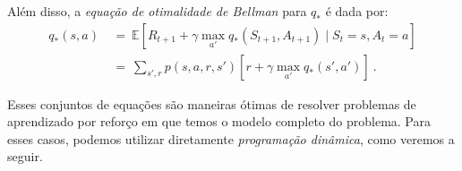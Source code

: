 \documentclass{article}
\begin{document}
            Além disso, a \emph{equação de otimalidade de Bellman} para $q_*$ é dada por:
            \begin{equation}
            \label{eq:optimal-action-value}
            \begin{split}
                q_*(s, a) & \ = \ \mathbb{E} [R_{t+1} + \gamma \max_{a'} q_*(S_{t+1}, A_{t+1}) \mid S_t = s, A_t = a] \\
                & \ = \ \sum_{s', r} p(s, a, r, s') [r + \gamma \max_{a'} q_*(s', a')]\ .
            \end{split}
            \end{equation}

            Esses conjuntos de equações são maneiras ótimas de resolver problemas de aprendizado por reforço em que temos o modelo completo do problema. Para esses casos, podemos utilizar diretamente \emph{programação dinâmica}, como veremos a seguir.
\end{document}
